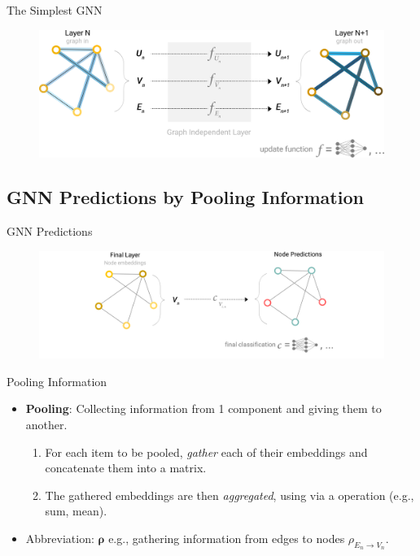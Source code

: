 \documentclass[
    11pt, %
    aspectratio=169, %
]{beamer}
\begin{document}
\begin{frame}{The Simplest GNN}
    \begin{figure}
        \centering
        \includegraphics[width=.9\textwidth]{Images/simplest-gnn.png}
    \end{figure}
\end{frame}

\subsection{GNN Predictions by Pooling Information}
\begin{frame}{GNN Predictions}
    \begin{figure}
        \centering
        \includegraphics[width=\textwidth]{Images/gnn-prediction.png}
    \end{figure}
\end{frame}

\begin{frame}{Pooling Information}
    \justifying
    \begin{itemize}[<+->]
        \item \textbf{Pooling}: Collecting information from 1 component and giving them to another.
        \vspace{.5em}
        \begin{enumerate}
            \itemsep.5em
            \item For each item to be pooled, \textit{gather} each of their embeddings and concatenate them into a matrix.
            \item The gathered embeddings are then \textit{aggregated}, using via a operation (e.g., sum, mean).
        \end{enumerate}

        \item Abbreviation: $\mathbf{\rho}$ e.g., gathering information from edges to nodes $\rho_{E_n \rightarrow V_n}$.
    \end{itemize}
\end{frame}
\end{document}

